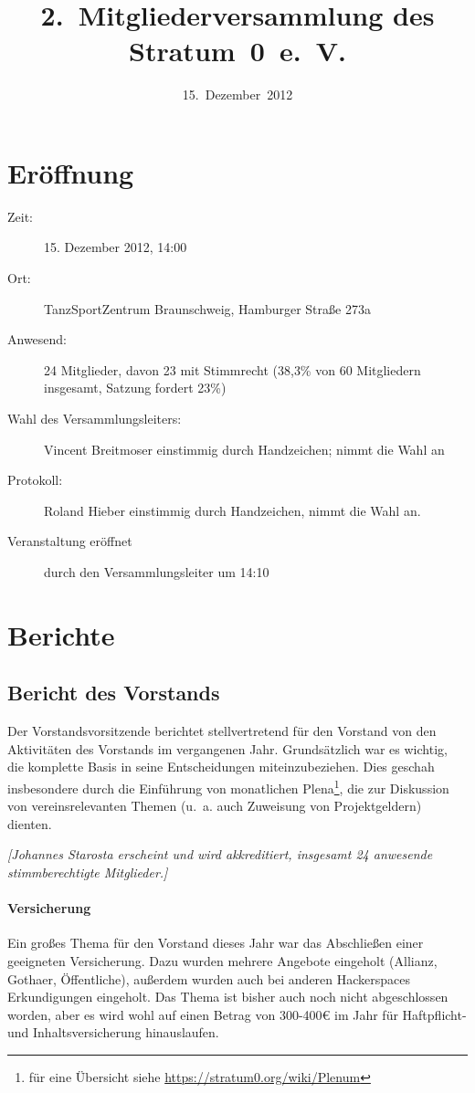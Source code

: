\documentclass[a4paper,12pt]{scrartcl}
\title{2.~Mitgliederversammlung des Stratum~0~e.~V.}
\date{15.~Dezember~2012}
\begin{document}
\maketitle
{\footnotesize\tableofcontents}

\section{Eröffnung}
\begin{description}
  \item[Zeit:] 15. Dezember 2012, 14:00
  \item[Ort:] TanzSportZentrum Braunschweig, Hamburger Straße 273a
  \item[Anwesend:] 24 Mitglieder, davon 23 mit Stimmrecht (38{,}3\% von 60
    Mitgliedern insgesamt, Satzung fordert 23\%)
  \item[Wahl des Versammlungsleiters:] Vincent Breitmoser einstimmig durch
    Handzeichen; nimmt die Wahl an
  \item[Protokoll:] Roland Hieber einstimmig durch Handzeichen, nimmt die Wahl
    an.
  \item[Veranstaltung eröffnet] durch den Versammlungsleiter um 14:10
\end{description}

\section{Berichte}
\subsection{Bericht des Vorstands}
Der Vorstandsvorsitzende berichtet stellvertretend für den Vorstand von den
Aktivitäten des Vorstands im vergangenen Jahr. Grundsätzlich war es wichtig, die
komplette Basis in seine Entscheidungen miteinzubeziehen. Dies geschah
insbesondere durch die Einführung von monatlichen Plena\footnote{für eine
Übersicht siehe \url{https://stratum0.org/wiki/Plenum}}, die zur Diskussion von
vereinsrelevanten Themen (u.~a. auch Zuweisung von Projektgeldern) dienten.

\emph{[Johannes Starosta erscheint und wird akkreditiert, insgesamt 24 anwesende
stimmberechtigte Mitglieder.]}

\paragraph{Versicherung}
Ein großes Thema für den Vorstand dieses Jahr war das Abschließen einer
geeigneten Versicherung. Dazu wurden mehrere Angebote eingeholt (Allianz,
Gothaer, Öffentliche), außerdem wurden auch bei anderen Hackerspaces
Erkundigungen eingeholt. Das Thema ist bisher auch noch nicht abgeschlossen
worden, aber es wird wohl auf einen Betrag von 300-400€ im Jahr für Haftpflicht-
und Inhaltsversicherung hinauslaufen.
\end{document}
